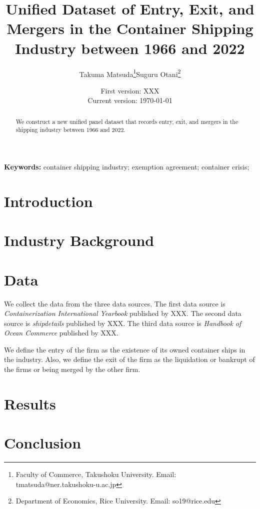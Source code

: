 \documentclass[11pt]{article}
\title{Unified Dataset of Entry, Exit, and Mergers in the Container Shipping Industry between 1966 and 2022}
\author{Takuma Matsuda\thanks{Faculty of Commerce, Takushoku University. Email: tmatsuda@ner.takushoku-u.ac.jp}\quad Suguru Otani\thanks{Department of Economics, Rice University. Email: so19@rice.edu}}
\date{
First version: XXX\\
Current version: \today
}
\begin{document}
\maketitle

\begin{abstract}
We construct a new unified panel dataset that records entry, exit, and mergers in the shipping industry between 1966 and 2022.
\end{abstract} 

\vspace{0.1in}
\noindent\textbf{Keywords:} container shipping industry; exemption agreement; container crisis; 
\vspace{0in}


\section{Introduction}


\section{Industry Background}

\section{Data}

We collect the data from the three data sources. 
The first data source is \textit{Containerization International Yearbook} published by XXX. 
The second data source is \textit{shipdetails} published by XXX.
The third data source is \textit{Handbook of Ocean Commerce} published by XXX.

We define the entry of the firm as the existence of its owned container ships in the industry. Also, we define the exit of the firm as the liquidation or bankrupt of the firms or being merged by the other firm. 


\section{Results}

\section{Conclusion}




\appendix
\end{document}
